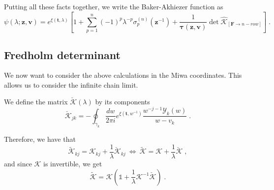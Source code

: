 \documentclass[a4paper,11pt]{amsart}
\begin{document}
Putting all these facts together, we write the Baker-Akhiezer function
as 
\begin{equation}
  \psi(\lambda; \bm{z}, \bm{v}) =
  e^{\xi(\bm{t}, \lambda)}  \left[ 1 + 
  \sum_{p=1}^n (-1)^p \lambda^{-p} \sigma_p^{(n)}(\bm{z}^{-1})
    + \frac{1}{\bm{\tau}(\bm{z}, \bm{v})}
    \det \widehat{\mathcal{K}}_{[\bm{F} \to n-row]}
  \right]\; .
\end{equation}



%



\subsection{Fredholm determinant}

We now want to consider the above calculations in the Miwa
coordinates. This allows us to consider the infinite chain limit.

We define the matrix \(\check{\mathcal{K}}(\lambda)\) by its components
\begin{equation}
    \check{\mathcal{K}}_{jk}  = -  
    \oint_{\gamma_k} \frac{dw}{2\pi i}
    e^{\xi(\bm{t}, w^{- 1})} \frac{w^{-j -1 }\mathcal{Y}_k(w)}{w - v_k} \; .
\end{equation}

Therefore, we have that 
\begin{equation}
  \widetilde{\mathcal{K}}_{kj} = 
  \mathcal{K}_{kj}  + \frac{1}{\lambda}
  \check{\mathcal{K}}_{kj}
  \ \Leftrightarrow \
  \widetilde{\mathcal{K}} = 
  \mathcal{K}  + \frac{1}{\lambda}
  \check{\mathcal{K}}\; , 
\end{equation}
and since \(\mathcal{K}\) is invertible, we get
\begin{equation}
  \widetilde{\mathcal{K}} = 
  \mathcal{K}\left( \mathbb{1}  +
  \frac{1}{\lambda}\mathcal{K}^{-1}\check{\mathcal{K}} \right)\; .
\end{equation}
\end{document}
